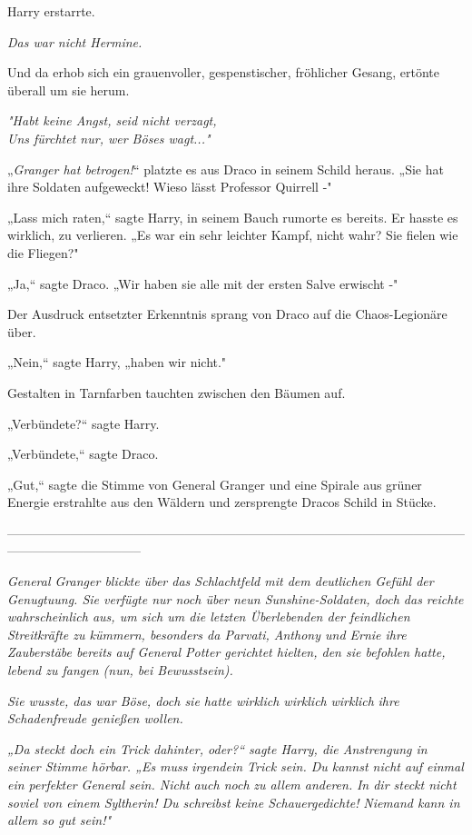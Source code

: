 {Harry erstarrte.

\emph{Das war nicht Hermine.}

Und da erhob sich ein grauenvoller, gespenstischer, fröhlicher Gesang, ertönte überall um sie herum.

\emph{"Habt keine Angst, seid nicht verzagt,\\ Uns fürchtet nur, wer Böses wagt..."}

„\emph{Granger hat betrogen!}“ platzte es aus Draco in seinem Schild heraus. „Sie hat ihre Soldaten aufgeweckt! Wieso lässt Professor Quirrell -"

„Lass mich raten,“ sagte Harry, in seinem Bauch rumorte es bereits. Er hasste es wirklich, zu verlieren. „Es war ein sehr leichter Kampf, nicht wahr? Sie fielen wie die Fliegen?"

„Ja,“ sagte Draco. „Wir haben sie alle mit der ersten Salve erwischt -"

Der Ausdruck entsetzter Erkenntnis sprang von Draco auf die Chaos-Legionäre über.

„Nein,“ sagte Harry, „haben wir nicht."

Gestalten in Tarnfarben tauchten zwischen den Bäumen auf.

„Verbündete?“ sagte Harry.

„Verbündete,“ sagte Draco.

„Gut,“ sagte die Stimme von General Granger und eine Spirale aus grüner Energie erstrahlte aus den Wäldern und zersprengte Dracos Schild in Stücke.

--------------------------------------------------------------------------------------------------------------------------------------------

\hfill\break \emph{General Granger blickte über das Schlachtfeld mit dem deutlichen Gefühl der Genugtuung. Sie verfügte nur noch über neun Sunshine-Soldaten, doch das reichte wahrscheinlich aus, um sich um die letzten Überlebenden der feindlichen Streitkräfte zu kümmern, besonders da Parvati, Anthony und Ernie ihre Zauberstäbe bereits auf General Potter gerichtet hielten, den sie befohlen hatte, lebend zu fangen (nun, bei Bewusstsein).}

\emph{Sie wusste, das war Böse, doch sie hatte wirklich wirklich} \emph{\emph{wirklich}} \emph{ihre Schadenfreude genießen wollen.}

\emph{„Da steckt doch ein Trick dahinter, oder?“ sagte Harry, die Anstrengung in seiner Stimme hörbar. „Es} \emph{\emph{muss}} \emph{irgendein Trick sein. Du kannst nicht auf einmal ein perfekter General sein. Nicht} \emph{auch noch} \emph{zu allem anderen.} \emph{In dir steckt nicht soviel von einem Syltherin! Du schreibst keine Schauergedichte!} \emph{\emph{Niemand kann in allem so gut sein!}"}

}
